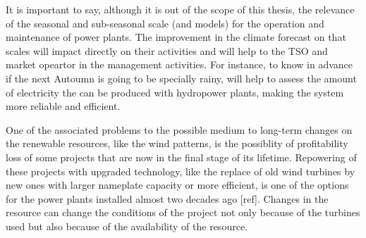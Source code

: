 It is important to say, although it is out of the scope of this thesis, the relevance of the seasonal and sub-seasonal scale (and models) for the operation and maintenance of power plants. The improvement in the climate forecast on that scales will impact directly on their activities and will help to the TSO and market opeartor in the management activities. For instance, to know in advance if the next Autoumn is going to be specially rainy, will help to assess the amount of electricity the can be produced with hydropower plants, making the system more reliable and efficient.


One of the associated problems to the possible medium to long-term changes on the renewable resources, like the wind patterns, is the possiblity of profitability loss of some projects that are now in the final stage of its lifetime. Repowering of these projects with upgraded technology, like the replace of old wind turbines by new ones with larger nameplate capacity or more efficient, is one of the options for the power plants installed almost two decades ago [ref]. Changes in the resource can change the conditions of the project not only because of the turbines used but also because of the availability of the resource.  
 

